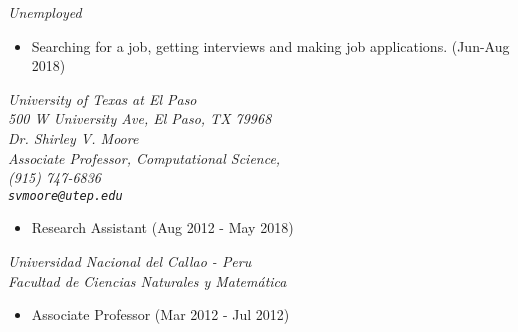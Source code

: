 \documentclass[margin]{res}
\begin{document}
\begin{resume}
{\sl Unemployed
} \hfill 
\begin{itemize}
\item Searching for a job, getting interviews and making job applications. (Jun-Aug 2018)
\end{itemize}

% 


{\sl University of Texas at El Paso\\
500 W University Ave, El Paso, TX  79968\\
Dr. Shirley V. Moore\\
Associate Professor, Computational Science,\\
(915) 747-6836\\%
\verb+svmoore@utep.edu+
} \hfill  
\begin{itemize}
\item Research Assistant (Aug 2012 - May 2018)
\end{itemize}

{\sl Universidad Nacional del Callao - Peru\\
Facultad de Ciencias Naturales y Matemática 
} \hfill  
\begin{itemize}
\item Associate Professor (Mar 2012 - Jul 2012)
\end{itemize}


\end{resume}
\end{document}
